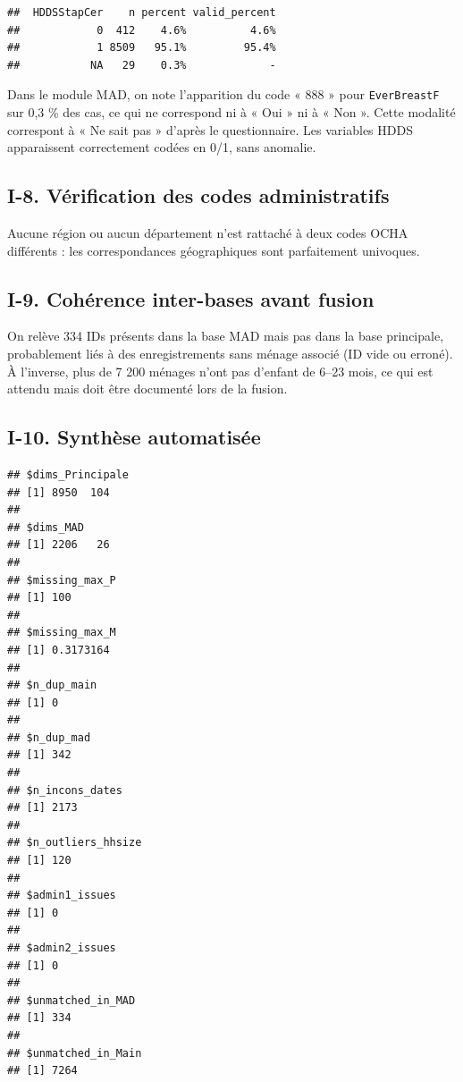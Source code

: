 \documentclass[
]{article}
\begin{document}
\begin{verbatim}
##  HDDSStapCer    n percent valid_percent
##            0  412    4.6%          4.6%
##            1 8509   95.1%         95.4%
##           NA   29    0.3%             -
\end{verbatim}

Dans le module MAD, on note l'apparition du code « 888 » pour
\texttt{EverBreastF} sur 0,3 \% des cas, ce qui ne correspond ni à « Oui
» ni à « Non ». Cette modalité correspont à « Ne sait pas » d'après le
questionnaire. Les variables HDDS apparaissent correctement codées en
0/1, sans anomalie.

\hypertarget{i-8.-vuxe9rification-des-codes-administratifs}{%
\subsection{I-8. Vérification des codes
administratifs}\label{i-8.-vuxe9rification-des-codes-administratifs}}

Aucune région ou aucun département n'est rattaché à deux codes OCHA
différents : les correspondances géographiques sont parfaitement
univoques.

\hypertarget{i-9.-cohuxe9rence-inter-bases-avant-fusion}{%
\subsection{I-9. Cohérence inter-bases avant
fusion}\label{i-9.-cohuxe9rence-inter-bases-avant-fusion}}

On relève 334 IDs présents dans la base MAD mais pas dans la base
principale, probablement liés à des enregistrements sans ménage associé
(ID vide ou erroné). À l'inverse, plus de 7 200 ménages n'ont pas
d'enfant de 6--23 mois, ce qui est attendu mais doit être documenté lors
de la fusion.

\hypertarget{i-10.-synthuxe8se-automatisuxe9e}{%
\subsection{I-10. Synthèse
automatisée}\label{i-10.-synthuxe8se-automatisuxe9e}}

\begin{verbatim}
## $dims_Principale
## [1] 8950  104
## 
## $dims_MAD
## [1] 2206   26
## 
## $missing_max_P
## [1] 100
## 
## $missing_max_M
## [1] 0.3173164
## 
## $n_dup_main
## [1] 0
## 
## $n_dup_mad
## [1] 342
## 
## $n_incons_dates
## [1] 2173
## 
## $n_outliers_hhsize
## [1] 120
## 
## $admin1_issues
## [1] 0
## 
## $admin2_issues
## [1] 0
## 
## $unmatched_in_MAD
## [1] 334
## 
## $unmatched_in_Main
## [1] 7264
\end{verbatim}
\end{document}
